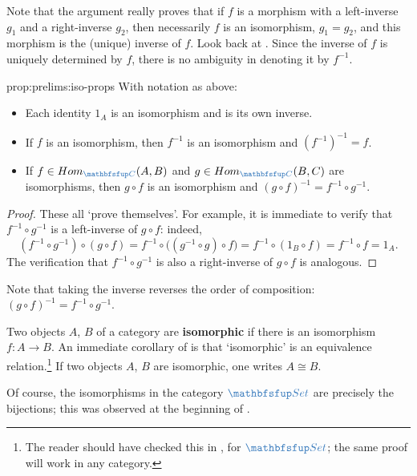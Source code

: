 Note that the argument really proves that if $f$ is a morphism with a
left-inverse $g_1$ and a right-inverse $g_2$, then necessarily $f$ is
an isomorphism, $g_1 = g_2$, and this morphism is the (unique) inverse
of $f$.  Look back at
. Since the inverse of $f$
is uniquely determined by $f$, there is no ambiguity in denoting it by
$f^{-1}$.

\begin{prop}{}{prop:prelims:iso-props}
  With notation as above:
  \begin{itemize}
  \item Each identity $1_A$ is an isomorphism and is its own inverse.
  \item If $f$ is an isomorphism, then $f^{-1}$ is an isomorphism and
    ${(f^{-1})}^{-1} = f$.
  \item If $f \in \Hom_{\categ{C}}(A,B)$ and
    $g \in \Hom_{\categ{C}}(B,C)$ are isomorphisms, then $g \circ f$
    is an isomorphism and ${(g \circ f)}^{-1} = f^{-1} \circ g^{-1}$.
  \end{itemize}
\end{prop}
\begin{proof}
  These all `prove themselves'. For example, it is immediate to verify
  that $f^{-1} \circ g^{-1}$ is a left-inverse of $g \circ f$: indeed,
  \[
    (f^{-1} \circ g^{-1}) \circ (g \circ f) = f^{-1} \circ
    \bigl((g^{-1} \circ g) \circ f\bigr) = f^{-1} \circ (1_B \circ f)
    = f^{-1} \circ f = 1_A.
  \]
  The verification that $f^{-1} \circ g^{-1}$ is also a right-inverse
  of $g \circ f$ is analogous.
\end{proof}

Note that taking the inverse reverses the order of composition:
${(g \circ f)}^{-1} = f^{-1} \circ g^{-1}$.

Two objects $A$, $B$ of a category are \textbf{isomorphic} if there is
an isomorphism $f \colon A \to B$. An immediate corollary of
 is that `isomorphic' is an equivalence
relation.\footnote{The reader should have checked this in
  , for $\categ{Set}$; the same
  proof will work in any category.} If two objects $A$, $B$ are
isomorphic, one writes $A \cong B$.

\begin{exam}{}{}
  Of course, the isomorphisms in the category $\categ{Set}$ are
  precisely the bijections; this was observed at the beginning of
  .
\end{exam}

